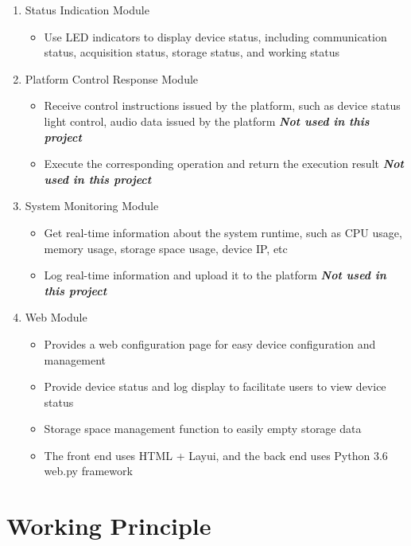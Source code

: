 \documentclass{article}
\begin{document}
\begin{enumerate}
\begin{itemize}
    \end{itemize}
    \item Status Indication Module
    \begin{itemize}
        \item Use LED indicators to display device status, including communication status, acquisition status, storage status, and working status
    \end{itemize}
    \item Platform Control Response Module
    \begin{itemize}
        \item Receive control instructions issued by the platform, such as device status light control, audio data issued by the platform {\bfseries\emph{Not used in this project}}
        \item Execute the corresponding operation and return the execution result {\bfseries\emph{Not used in this project}}
    \end{itemize}
    \item System Monitoring Module
    \begin{itemize}
        \item Get real-time information about the system runtime, such as CPU usage, memory usage, storage space usage, device IP, etc
        \item Log real-time information and upload it to the platform {\bfseries\emph{Not used in this project}}
    \end{itemize}
    \item Web Module
    \begin{itemize}
        \item Provides a web configuration page for easy device configuration and management
        \item Provide device status and log display to facilitate users to view device status
        \item Storage space management function to easily empty storage data
        \item The front end uses HTML + Layui, and the back end uses Python 3.6 web.py framework
    \end{itemize}
\end{enumerate}
\clearpage
\section{Working Principle}
\end{document}
